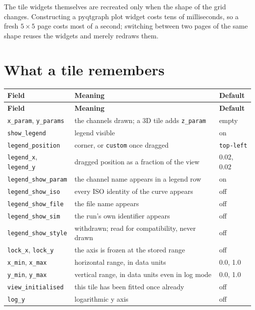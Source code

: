 \documentclass[11pt,a4paper,oneside]{report}
\newcommand{\code}[1]{\texttt{#1}}
\begin{document}
The tile widgets themselves are recreated only when the shape of the grid
changes. Constructing a pyqtgraph plot widget costs tens of milliseconds, so a
fresh $5 \times 5$ page costs most of a second; switching between two pages of
the same shape reuses the widgets and merely redraws them.

\section{What a tile remembers}

\begin{center}
\small
\begin{longtable}{@{}p{}p{}p{}@{}}
\toprule
\textbf{Field} & \textbf{Meaning} & \textbf{Default} \\
\midrule
\endfirsthead
\toprule
\textbf{Field} & \textbf{Meaning} & \textbf{Default} \\
\midrule
\endhead
\code{x\_param}, \code{y\_params} & the channels drawn; a 3D tile adds \code{z\_param} & empty \\
\code{show\_legend} & legend visible & on \\
\code{legend\_position} & corner, or \code{custom} once dragged & \code{top-left} \\
\code{legend\_x}, \code{legend\_y} & dragged position as a fraction of the view & 0.02, 0.02 \\
\code{legend\_show\_param} & the channel name appears in a legend row & on \\
\code{legend\_show\_iso} & every ISO identity of the curve appears & off \\
\code{legend\_show\_file} & the file name appears & off \\
\code{legend\_show\_sim} & the run's own identifier appears & off \\
\code{legend\_show\_style} & withdrawn; read for compatibility, never drawn & off \\
\code{lock\_x}, \code{lock\_y} & the axis is frozen at the stored range & off \\
\code{x\_min}, \code{x\_max} & horizontal range, in data units & 0.0, 1.0 \\
\code{y\_min}, \code{y\_max} & vertical range, in data units even in log mode & 0.0, 1.0 \\
\code{view\_initialised} & this tile has been fitted once already & off \\
\code{log\_y} & logarithmic y axis & off \\

\end{longtable}
\end{center}
\end{document}
